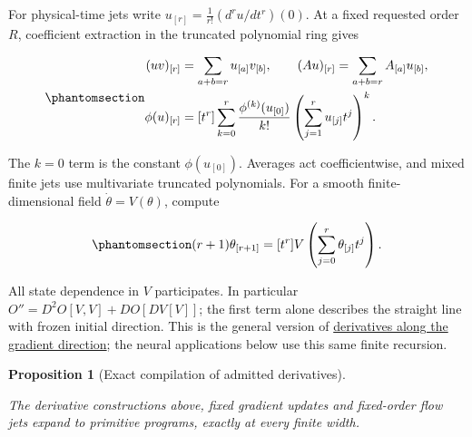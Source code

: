 \documentclass[
  11pt,
]{article}
\theoremstyle{definition}
\theoremstyle{plain}
\theoremstyle{plain}
\newtheorem{proposition}{Proposition}[section]
\theoremstyle{plain}
\theoremstyle{remark}
\begin{document}
For physical-time jets write \(u_{[r]}=\frac1{r!}(d^ru/dt^r)(0)\). At a
fixed requested order \(R\), coefficient extraction in the truncated
polynomial ring gives

\begin{equation}\protect\phantomsection\label{eq-mfp-jet-algebra}{
\begin{aligned}
(uv)_{[r]}&=\sum_{a+b=r}u_{[a]}v_{[b]},\qquad
(Au)_{[r]}=\sum_{a+b=r}A_{[a]}u_{[b]},\\
\phi(u)_{[r]}&=[t^r]\sum_{k=0}^r\frac{\phi^{(k)}(u_{[0]})}{k!}
                 \left(\sum_{j=1}^r u_{[j]}t^j\right)^k.
\end{aligned}
}\end{equation}

The \(k=0\) term is the constant \(\phi(u_{[0]})\). Averages act
coefficientwise, and mixed finite jets use multivariate truncated
polynomials. For a smooth finite-dimensional field
\(\dot\theta=V(\theta)\), compute

\begin{equation}\protect\phantomsection\label{eq-mfp-flow-jet-recursion}{
(r+1)\theta_{[r+1]}=[t^r]V\left(\sum_{j=0}^r\theta_{[j]}t^j\right).
}\end{equation}

All state dependence in \(V\) participates. In particular
\(O''=D^2O[V,V]+DO[DV[V]]\); the first term alone describes the straight
line with frozen initial direction. This is the general version of
\hyperref[sec-docs-gaussian-calculus-l170]{derivatives along the
gradient direction}; the neural applications below use this same finite
recursion.

\begin{proposition}[Exact compilation of admitted
derivatives]\protect\hypertarget{prp-mfp-derivative-closure}{}\label{prp-mfp-derivative-closure}

The derivative constructions above, fixed gradient updates and
fixed-order flow jets expand to primitive programs, exactly at every
finite width.

\end{proposition}

\protect{}\label{proof-mfp-derivative-closure}{}
\end{document}
